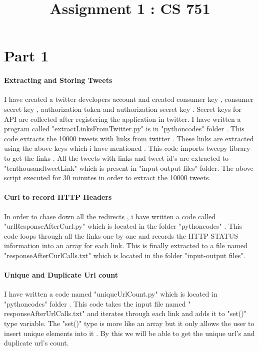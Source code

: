 \documentclass[12pt]{Report}
\begin{document}
\title{Assignment 1 : CS 751 }
\maketitle


\section{Part 1}

\paragraph{Extracting and Storing  Tweets}
I have created a twitter developers account and created consumer key , consumer secret key , authorization token and authorization secret key . Secret keys for API are collected after registering the application in twitter. I have written a program called "extractLinksFromTwitter.py" is in "pythoncodes" folder . This code extracts the 10000 tweets with links from twitter . These links are extracted using the above keys which i have mentioned . This code imports tweepy library to get the links . All the tweets with links and tweet id's  are extracted to "tenthousandtweetLink" which is present in "input-output files" folder.  The above script executed for 30 minutes in order to extract the 10000 tweets. 

\paragraph{Curl to record HTTP Headers}

In order to chase down all the redirects , i have written a code called "urlResponseAfterCurl.py" which is located in the folder "pythoncodes" .
This code loops through all the links one by one and records the HTTP STATUS information into an array for each link. This is finally extracted to a file named "responseAfterCurlCalls.txt" which is located in the folder "input-output files".

\paragraph{Unique and Duplicate Url count } 

I have written a code named "uniqueUrlCount.py" which is located in "pythoncodes" folder . This code takes the input file named " responseAfterUrlCalls.txt" and iterates through each link and adds it to "set()"  type variable. The "set()" type is more like an array but it only allows the user to insert unique elements into it . By this we will be able to get the unique url's and duplicate url's count.
\end{document}
